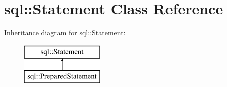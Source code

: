 \hypertarget{classsql_1_1_statement}{}\section{sql\+:\+:Statement Class Reference}
\label{classsql_1_1_statement}
Inheritance diagram for sql\+:\+:Statement\+:\begin{figure}[H]
\begin{center}
\leavevmode
\includegraphics[height=2.000000cm]{classsql_1_1_statement}
\end{center}
\end{figure}
